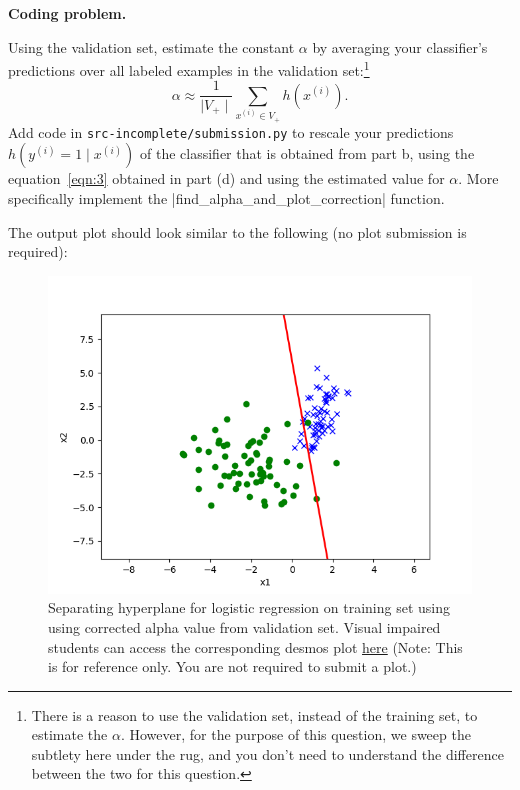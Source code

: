 \item {} \textbf{Coding problem.}

Using the validation set, estimate the constant $\alpha$ by averaging your
classifier's predictions over all labeled examples in the validation set:\footnote{There is a reason to use the validation set, instead of the training set, to estimate the $\alpha$. However, for the purpose of this question, we sweep the subtlety here under the rug, and you don't need to understand the difference between the two for this question. } 
%
\begin{equation*}
  \alpha \approx \frac{1}{\mid V_{+} \mid}\sum_{x^{(i)}\in V_{+}} h(x^{(i)}).
\end{equation*}
%
Add code in \texttt{src-incomplete/submission.py} to rescale your
 predictions $h(y^{(i)}=1\mid x^{(i)})$ of the classifier that is obtained from part b,  using the equation~\eqref{eqn:3} obtained in part (d) and using the estimated value for $\alpha$. 
More specifically implement the |find_alpha_and_plot_correction| function.

 The output plot should look similar to the following (no plot submission is required):
 \begin{figure}[H]
   \centering
   \vspace{2mm}
   \includegraphics[width=0.5\linewidth]{02-posonly/posonly_adjusted_pred.png}
     \caption{Separating hyperplane for logistic regression on training set using using corrected alpha value from validation set. Visual impaired students can access the corresponding desmos plot \href{https://www.desmos.com/calculator/ubx1xhn2j6}{here} (Note: This is for reference only.  You are not required to submit a plot.)}
 \end{figure}

